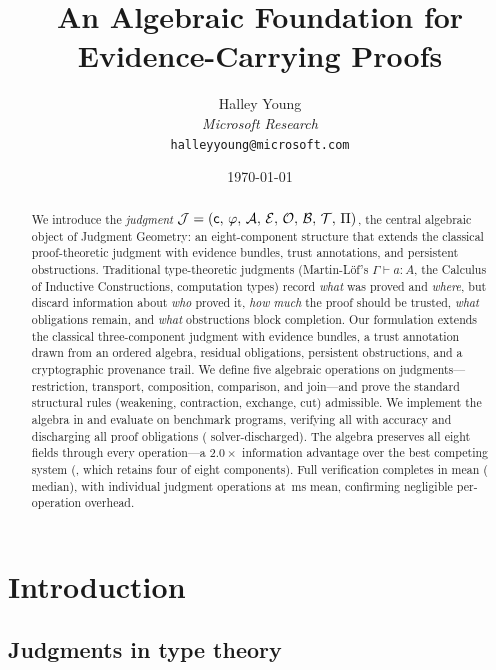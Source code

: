 \documentclass[11pt]{article}
\title{\textbf{An Algebraic Foundation for Evidence-Carrying Proofs}}
\author{%
  Halley Young\\
  \textit{Microsoft Research}\\
  \texttt{halleyyoung@microsoft.com}
}
\date{\today}
\begin{document}
\maketitle

\begin{abstract}
We introduce the \emph{judgment}
$\mathcal{J} = (\mathsf{c},\,\varphi,\,\mathcal{A},\,\mathcal{E},\,\mathcal{O},\,\mathcal{B},\,\mathcal{T},\,\Pi)$,
the central algebraic object of Judgment Geometry: an eight-component
structure that extends the classical proof-theoretic judgment with
evidence bundles, trust annotations, and persistent obstructions.
Traditional type-theoretic judgments
(Martin-L\"of's $\Gamma \vdash a : A$, the Calculus of Inductive Constructions,
\Fstar{} computation types)
record \emph{what} was proved and \emph{where}, but discard information about
\emph{who} proved it, \emph{how much} the proof should be trusted, \emph{what}
obligations remain, and \emph{what} obstructions block completion.
Our formulation extends the classical three-component judgment with evidence bundles,
a trust annotation drawn from an ordered algebra, residual obligations,
persistent obstructions, and a cryptographic provenance trail.
We define five algebraic operations on judgments---restriction, transport,
composition, comparison, and join---and prove the standard structural rules
(weakening, contraction, exchange, cut) admissible.
We implement the algebra in \Python{} and evaluate on \compTotalPrograms{}
benchmark programs, verifying all \compTotalVerified{} with
\compOverallAccuracy{} accuracy and discharging all \compTrustTotal{}
proof obligations (\compTrustSolverdischargedPct{} solver-discharged).
The algebra preserves all eight fields through every operation---a
$2.0\times$ information advantage over the best competing system
(\Fstar{}, which retains four of eight components).  Full verification
completes in \compTimeMean{} mean (\compTimeMedian{} median), with
individual judgment operations at \compMethodsMeanMs{}\,ms mean,
confirming negligible per-operation overhead.
\end{abstract}

\newpage

\section{Introduction}\label{sec:intro}

\subsection{Judgments in type theory}
\end{document}
